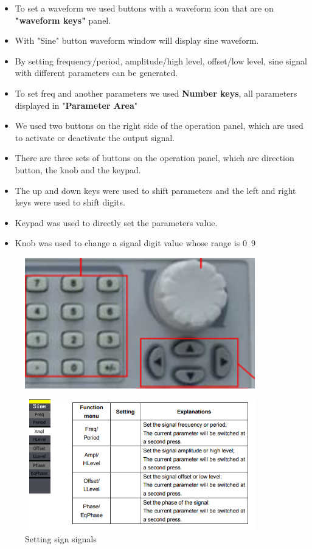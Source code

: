 \begin{itemize}
	\item To set a waveform we used buttons with a waveform icon that are on \textbf{"waveform keys"} panel.
	\item With "Sine" button waveform window will display sine waveform.
	\item By setting frequency/period, amplitude/high level, offset/low level, sine signal with different parameters can be generated.
	\item To set freq and another parameters we used \textbf{Number keys}, all parameters displayed in "\textbf{Parameter Area}"
	\item We used two buttons on the right side of the
   operation panel, which are used to activate or deactivate the output signal.
	\item There are three sets of buttons on the operation
  panel, which are direction button, the knob and the keypad.
	\item The up and down keys were used to shift parameters and the left and right
     keys were used to shift digits.
	\item Keypad was used to directly set the parameters value.
	\item Knob was used to change a signal digit value whose range is 0~9
\end{itemize}

\begin{figure}[H]
	\centering
	\includegraphics[width=10cm]{images/13.png}
	\label{fig:wow3}
\end{figure}

\begin{figure}[H]
	\centering
	\includegraphics[width=10cm]{images/14.png}
	\caption{Setting sign signals}
	\label{fig:wow4}
\end{figure}

